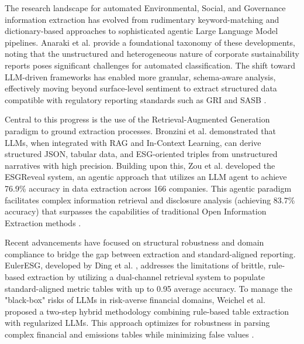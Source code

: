\documentclass[english, online, cse, master]{dithesis}
\begin{document}
The research landscape for automated Environmental, Social, and Governance information extraction has evolved from rudimentary keyword-matching and dictionary-based approaches to sophisticated agentic Large Language Model pipelines. Anaraki et al.  \parencite{seyed_alireza_mousavian_anaraki_b56a1c0f} provide a foundational taxonomy of these developments, noting that the unstructured and heterogeneous nature of corporate sustainability reports poses significant challenges for automated classification. The shift toward LLM-driven frameworks has enabled more granular, schema-aware analysis, effectively moving beyond surface-level sentiment to extract structured data compatible with regulatory reporting standards such as GRI and SASB  \parencite{seyed_alireza_mousavian_anaraki_b56a1c0f}.

Central to this progress is the use of the Retrieval-Augmented Generation paradigm to ground extraction processes. Bronzini et al.  \parencite[]{marco_bronzini_bf94d949, marco_bronzini_bf94d949} demonstrated that LLMs, when integrated with RAG and In-Context Learning, can derive structured JSON, tabular data, and ESG-oriented triples from unstructured narratives with high precision. Building upon this, Zou et al.  \parencite{yi_zou_37c055f7} developed the ESGReveal system, an agentic approach that utilizes an LLM agent to achieve 76.9\% accuracy in data extraction across 166 companies. This agentic paradigm facilitates complex information retrieval and disclosure analysis (achieving 83.7\% accuracy) that surpasses the capabilities of traditional Open Information Extraction methods  \parencite[]{yi_zou_37c055f7, marco_bronzini_bf94d949}.

Recent advancements have focused on structural robustness and domain compliance to bridge the gap between extraction and standard-aligned reporting. EulerESG, developed by Ding et al.  \parencite{yi_ding_136f177b}, addresses the limitations of brittle, rule-based extraction by utilizing a dual-channel retrieval system to populate standard-aligned metric tables with up to 0.95 average accuracy. To manage the "black-box" risks of LLMs in risk-averse financial domains, Weichel et al.  \parencite{hendrik_weichel_5ea70935} proposed a two-step hybrid methodology combining rule-based table extraction with regularized LLMs. This approach optimizes for robustness in parsing complex financial and emissions tables while minimizing false values  \parencite{hendrik_weichel_5ea70935}.
\end{document}

